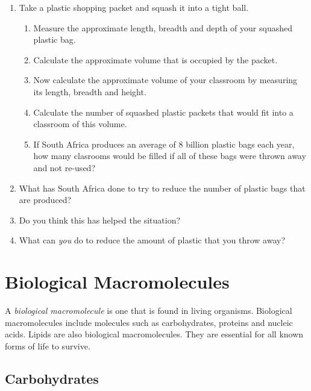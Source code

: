 {\begin{enumerate}
\item{Take a plastic shopping packet and squash it into a tight ball.} 
	\begin{enumerate}
	\item{Measure the approximate length, breadth and depth of your squashed plastic bag.}
	\item{Calculate the approximate volume that is occupied by the packet.}
	\item{Now calculate the approximate volume of your classroom by measuring its length, breadth and height.}
	\item{Calculate the number of squashed plastic packets that would fit into a classroom of this volume.}
	\item{If South Africa produces an average of 8 billion plastic bags each year, how many clasrooms would be filled if all of these bags were thrown away and not re-used?}
	\end{enumerate}
\item{What has South Africa done to try to reduce the number of plastic bags that are produced?}
\item{Do you think this has helped the situation?}
\item{What can \textit{you} do to reduce the amount of plastic that you throw away?}
\end{enumerate}
}






\section{Biological Macromolecules}
\label{sec:orgmac:bm}

A \textit{biological macromolecule} is one that is found in living organisms. Biological macromolecules include molecules such as carbohydrates, proteins and nucleic acids. Lipids are also biological macromolecules. They are essential for all known forms of life to survive.


\subsection{Carbohydrates}
\label{subsec:orgmac:carbohydrates}

